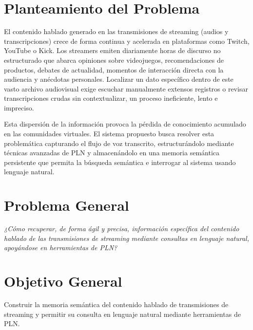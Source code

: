 \documentclass[12pt,a4paper]{article}
\begin{document}
\section{Planteamiento del Problema}
El contenido hablado generado en las transmisiones de streaming (audios y transcripciones) crece de forma continua y acelerada en plataformas como Twitch, YouTube o Kick. Los streamers emiten diariamente horas de discurso no estructurado que abarca opiniones sobre videojuegos, recomendaciones de productos, debates de actualidad, momentos de interacción directa con la audiencia y anécdotas personales. Localizar un dato específico dentro de este vasto archivo audiovisual exige escuchar manualmente extensos registros o revisar transcripciones crudas sin contextualizar, un proceso ineficiente, lento e impreciso.

Esta dispersión de la información provoca la pérdida de conocimiento acumulado en las comunidades virtuales. El sistema propuesto busca resolver esta problemática capturando el flujo de voz transcrito, estructurándolo mediante técnicas avanzadas de PLN y almacenándolo en una memoria semántica persistente que permita la búsqueda semántica e interrogar al sistema usando lenguaje natural.

\section{Problema General}
\emph{¿Cómo recuperar, de forma ágil y precisa, información específica del contenido hablado de las transmisiones de streaming mediante consultas en lenguaje natural, apoyándose en herramientas de PLN?}

\section{Objetivo General}
Construir la memoria semántica del contenido hablado de transmisiones de streaming y permitir su consulta en lenguaje natural mediante herramientas de PLN.
\end{document}
